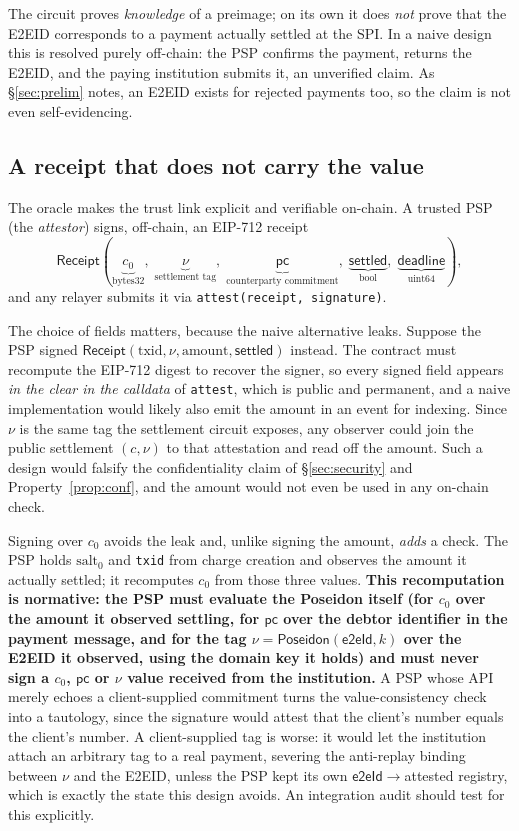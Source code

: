\documentclass[11pt]{article}
\newcommand{\Poseidon}{\ensuremath{\mathsf{Poseidon}}}
\newcommand{\eeid}{\ensuremath{\mathsf{e2eId}}}
\newcommand{\code}[1]{\texttt{#1}}
\begin{document}
The circuit proves \emph{knowledge} of a preimage; on its own it does \emph{not}
prove that the E2EID corresponds to a payment actually settled at the SPI. In a
naive design this is resolved purely off-chain: the PSP confirms the payment,
returns the E2EID, and the paying institution submits it, an unverified claim.
As \S\ref{sec:prelim} notes, an E2EID exists for rejected payments too, so the
claim is not even self-evidencing.

\subsection{A receipt that does not carry the value}
The oracle makes the trust link explicit and verifiable on-chain. A trusted PSP
(the \emph{attestor}) signs, off-chain, an EIP-712 receipt
\[
\mathsf{Receipt}(\underbrace{c_0}_{\text{bytes32}},\;
\underbrace{\nu}_{\text{settlement tag}},\;
\underbrace{\mathsf{pc}}_{\text{counterparty commitment}},\;
\underbrace{\mathsf{settled}}_{\text{bool}},\;
\underbrace{\mathsf{deadline}}_{\text{uint64}}),
\]
and any relayer submits it via \code{attest(receipt, signature)}.

The choice of fields matters, because the naive alternative leaks. Suppose the
PSP signed $\mathsf{Receipt}(\text{txid},\nu,\text{amount},\mathsf{settled})$
instead. The contract must recompute the EIP-712 digest to recover the signer,
so every signed field appears \emph{in the clear in the calldata} of
\code{attest}, which is public and permanent, and a naive implementation would
likely also emit the amount in an event for indexing. Since $\nu$ is the same
tag the settlement circuit exposes, any observer could join the public
settlement $(c,\nu)$ to that attestation and read off the amount. Such a design
would falsify the confidentiality claim of \S\ref{sec:security} and
Property~\ref{prop:conf}, and the amount would not even be used in any on-chain
check.

Signing over $c_0$ avoids the leak and, unlike signing the amount, \emph{adds} a
check. The PSP holds $\text{salt}_0$ and \code{txid} from charge creation and
observes the amount it actually settled; it recomputes $c_0$ from those three
values. \textbf{This recomputation is normative: the PSP must evaluate the
Poseidon itself (for $c_0$ over the amount it observed settling, for
$\mathsf{pc}$ over the debtor identifier in the payment message, and for the tag
$\nu=\Poseidon(\eeid,k)$ over the E2EID it observed, using the domain key it
holds) and must never sign a $c_0$, $\mathsf{pc}$ or $\nu$ value received from
the institution.} A PSP whose API merely echoes a client-supplied commitment
turns the value-consistency check into a tautology, since the signature would
attest that the client's number equals the client's number. A client-supplied
tag is worse: it would let the institution attach an arbitrary tag to a real
payment, severing the anti-replay binding between $\nu$ and the E2EID, unless
the PSP kept its own \eeid{}$\to$attested registry, which is exactly the state
this design avoids. An integration audit should test for this explicitly.
\end{document}

